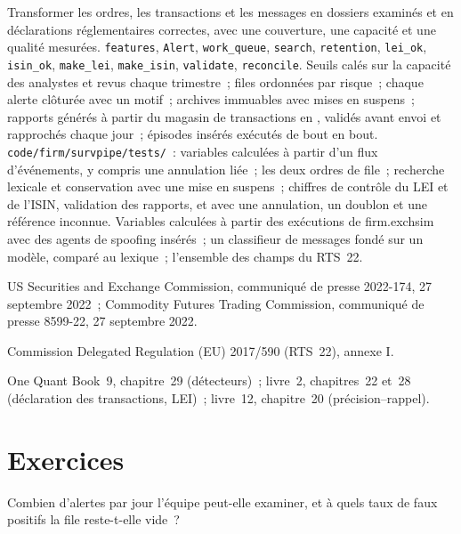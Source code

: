 \begin{build}
 Transformer les ordres, les transactions et les messages en dossiers examinés et en déclarations réglementaires correctes, avec une couverture, une capacité et
une qualité mesurées.
 \texttt{features}, \texttt{Alert}, \texttt{work\_queue}, \texttt{search}, \texttt{retention}, \texttt{lei\_ok},
\texttt{isin\_ok}, \texttt{make\_lei}, \texttt{make\_isin}, \texttt{validate}, \texttt{reconcile}.
 Seuils calés sur la capacité des analystes et revus chaque trimestre~; files ordonnées par risque~; chaque alerte clôturée avec un motif~;
archives immuables avec mises en suspens~; rapports générés à partir du magasin de transactions en , validés avant envoi et rapprochés chaque jour~;
épisodes insérés exécutés de bout en bout.
 \texttt{code/firm/survpipe/tests/}~: variables calculées à partir d'un flux d'événements, y compris une annulation liée~; les deux
ordres de file~; recherche lexicale et conservation avec une mise en suspens~; chiffres de contrôle du LEI et de l'ISIN, validation des rapports, et  avec une annulation, un
doublon et une référence inconnue.
 Variables calculées à partir des exécutions de firm.exchsim avec des agents de spoofing insérés~; un classifieur de messages fondé sur un modèle, comparé au lexique~;
l'ensemble des champs du RTS~22.
\end{build}

\begin{omsources}
\item US Securities and Exchange Commission, communiqué de presse 2022-174, 27 septembre 2022~; Commodity Futures Trading Commission, communiqué de presse
8599-22, 27 septembre 2022.
\item Commission Delegated Regulation (EU) 2017/590 (RTS~22), annexe I.
\item One Quant Book~9, chapitre~29 (détecteurs)~; livre~2, chapitres~22 et~28 (déclaration des transactions, LEI)~; livre~12, chapitre~20 (précision--rappel).
\end{omsources}

\section{Exercices}

\begin{exercise}[$\star$]\label{exo:pl:surveillance-and-compliance-technology:1}
Combien d'alertes par jour l'équipe peut-elle examiner, et à quels taux de faux positifs la file reste-t-elle vide~?
\end{exercise}

